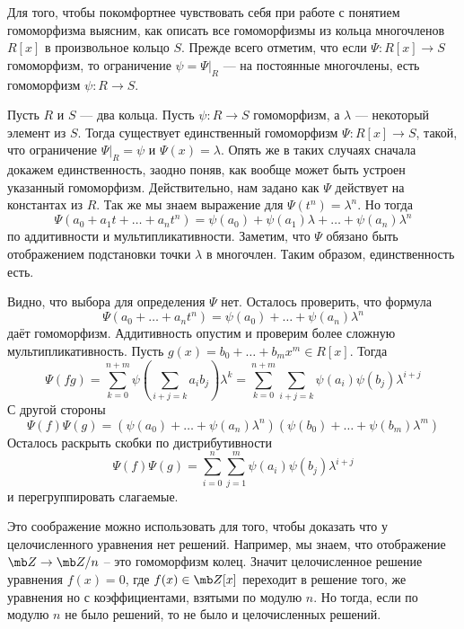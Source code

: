 Для того, чтобы покомфортнее чувствовать себя при работе с понятием гомоморфизма выясним, как описать все
гомоморфизмы из кольца многочленов $R[x]$ в произвольное кольцо $S$. Прежде всего отметим, что если $\Psi \colon R[x]\to S$ гомоморфизм, то ограничение $\psi= \Psi|_{R}$ --- на постоянные многочлены, есть гомоморфизм $\psi \colon R \to S$.

\thrm Пусть $R$ и $S$ --- два кольца. Пусть $\psi \colon R \to S$ гомоморфизм, а $\lambda$ --- некоторый элемент из $S$. Тогда
существует единственный гомоморфизм $\Psi \colon R[x]\to S$, такой, что ограничение $\Psi|_{R}=\psi$ и $\Psi(x)=\lambda$.
\ethrm
\proof Опять же в таких случаях сначала докажем единственность, заодно поняв, как вообще может быть устроен указанный гомоморфизм.
Действительно, нам задано как $\Psi$ действует на константах из $R$. Так же мы знаем выражение для $\Psi(t^n)= \lambda^n$. Но тогда 
$$\Psi(a_0+ a_1 t+\dots+a_nt^n)=\psi(a_0)+\psi(a_1)\lambda+\dots+\psi(a_n)\lambda^n$$
по аддитивности и мультипликативности. Заметим, что $\Psi$ обязано быть отображением подстановки точки $\lambda$ в многочлен. Таким образом, единственность есть.

Видно, что выбора для определения $\Psi$ нет. Осталось проверить, что формула $$\Psi(a_0+\dots+a_nt^n)=\psi(a_0)+\dots+\psi(a_n)\lambda^n$$
даёт гомоморфизм. Аддитивность опустим и проверим более сложную мультипликативность. Пусть $g(x)=b_0+\dots+b_mx^m\in R[x]$. 
Тогда 
$$\Psi(fg)=\sum_{k=0}^{n+m}\psi\left(\sum_{i+j=k} a_ib_j \right)\lambda^k=\sum_{k=0}^{n+m}\sum_{i+j=k} \psi(a_i)\psi(b_j) \lambda^{i+j}$$
С другой стороны 
$$\Psi(f)\Psi(g)=\left(\psi(a_0)+\dots+\psi(a_n)\lambda^n\right)\left(\psi(b_0)+\dots+\psi(b_m)\lambda^m\right)$$
Осталось раскрыть скобки по дистрибутивности
$$\Psi(f)\Psi(g)=\sum_{i=0}^{n}\sum_{j=1}^m \psi(a_i)\psi(b_j) \lambda^{i+j}$$
и перегруппировать слагаемые.
\endproof












Это соображение можно использовать для того, чтобы доказать что у целочисленного уравнения нет решений. Например, мы знаем, что отображение $\mb Z \to \mb Z/n$ -- это гомоморфизм колец. Значит целочисленное решение уравнения $f(x)=0$, где $f(x)\in \mb Z[x]$ переходит в решение того, же уравнения но с коэффициентами, взятыми по модулю $n$. Но тогда, если по модулю $n$ не было  решений, то не было и целочисленных решений. 





